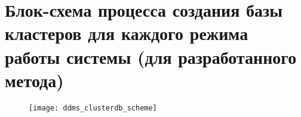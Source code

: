 \chapter{Блок-схема процесса создания базы кластеров для каждого режима работы системы (для разработанного метода)}
\label{app:DDMS:ClusterDBScheme}
\begin{figure}[H]
\texttt{[image: ddms\_clusterdb\_scheme]}
\end{figure}